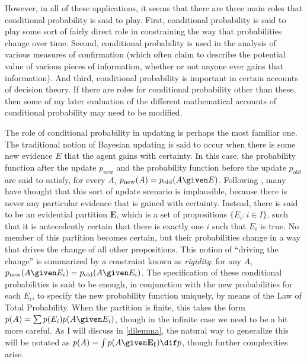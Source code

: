 However, in all of these applications, it seems that there are three main roles that conditional probability is said to play. First, conditional probability is said to play some sort of fairly direct role in constraining the way that probabilities change over time. Second, conditional probability is used in the analysis of various measures of confirmation (which often claim to describe the potential value of various pieces of information, whether or not anyone ever gains that information). And third, conditional probability is important in certain accounts of decision theory. If there are roles for conditional probability other than these, then some of my later evaluation of the different mathematical accounts of conditional probability may need to be modified.

The role of conditional probability in updating is perhaps the most familiar one. The traditional notion of Bayesian updating is said to occur when there is some new evidence $E$ that the agent gains with certainty. In this case, the probability function after the update $p_{\text{new}}$ and the probability function before the update $p_{\text{old}}$ are said to satisfy, for every $A$, $p_{\text{new}}(A)=p_{\text{old}}(A \given E)$. Following \citet{jeffrey}, many have thought that this sort of update scenario is implausible, because there is never any particular evidence that is gained with certainty. Instead, there is said to be an evidential partition $\mathbf{E}$, which is a set of propositions $\{E_i\colon i\in I\}$, such that it is antecedently certain that there is exactly one $i$ such that $E_i$ is true. No member of this partition becomes certain, but their probabilities change in a way that drives the change of all other propositions. This notion of ``driving the change'' is summarized by a constraint known as \textit{rigidity}: for any $A$, $p_{\text{new}}(A \given E_i)=p_{\text{old}}(A \given E_i)$. The specification of these conditional probabilities is said to be enough, in conjunction with the new probabilities for each $E_i$, to specify the new probability function uniquely, by means of the Law of Total Probability. When the partition is finite, this takes the form $p(A)=\sum p(E_i)p(A \given E_i)$, though in the infinite case we need to be a bit more careful. As I will discuss in \autoref{dilemma}, the natural way to generalize this will be notated as $p(A)=\int p(A \given \mathbf{E_I}) \dif p$, though further complexities arise.

